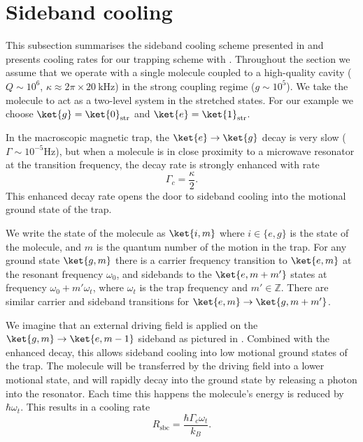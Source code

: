 \section{Sideband cooling}

This subsection summarises the sideband cooling scheme presented in
 and presents cooling rates for our trapping scheme with
\CaF{}.  Throughout the section we assume that we operate with a single molecule
coupled to a high-quality cavity ($Q\sim10^6$, $\kappa \approx 2\pi\times
\SI{20}{\kilo\hertz}$) in the strong coupling regime ($g\sim10^5$). We take
the molecule to act as a two-level system in the stretched states.
For our example we choose $\ket{g}=\ket{0}_\text{str}$ and
$\ket{e}=\ket{1}_\text{str}$. 

In the macroscopic magnetic trap, the
$\ket{e}\rightarrow\ket{g}$ decay is very slow ($\Gamma \sim
10^{-5}\si{\hertz}$), but when a molecule is in close proximity to a microwave
resonator at the transition frequency, the decay rate is strongly enhanced
with rate
%
\begin{equation}
  \Gamma_c = \frac{\kappa}{2}.
\end{equation}
%
This enhanced decay rate opens the door to sideband cooling into the motional
ground state of the trap.

We write the state of the molecule as $\ket{i, m}$ where $i\in\{e,g\}$ is the
state of the molecule, and $m$ is the quantum number of the motion
in the trap. For any ground state $\ket{g,m}$ there is a carrier frequency
transition to $\ket{e, m}$ at the resonant frequency $\omega_0$, and sidebands
to the $\ket{e, m+m'}$ states at frequency $\omega_0 + m'\omega_t$, where
$\omega_t$ is the trap frequency and $m'\in \mathbb{Z}$. There are similar
carrier and sideband transitions for $\ket{e,m} \rightarrow \ket{g, m+m'}$.

We imagine that an external driving field is applied on the
$\ket{g, m} \rightarrow \ket{e, m-1}$ sideband as pictured in
. Combined with the enhanced decay, this allows
sideband cooling into low motional ground states of the trap. The molecule will
be transferred by the driving field into a lower motional state, and will
rapidly decay into the ground state by releasing a photon into the resonator.
Each time this happens the molecule's energy is reduced by $\hbar\omega_t$.
This results in a cooling rate
%
\begin{equation}
  R_\text{sbc} = \frac{\hbar\Gamma_c\omega_t}{k_B}.
\end{equation}


